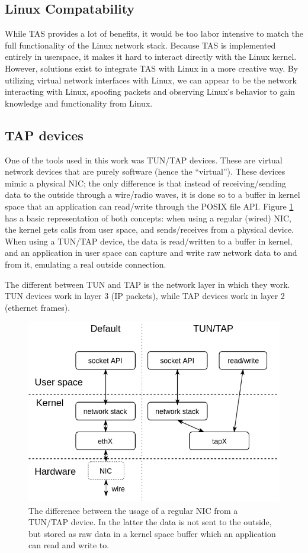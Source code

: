 \subsection{Linux Compatability}

While TAS provides a lot of benefits, it would be too labor intensive to match 
the full functionality of the Linux network stack. Because TAS is implemented
entirely in userspace, it makes it hard to interact directly with the Linux 
kernel. However, solutions exist to integrate TAS with Linux in a more creative
way. By utilizing virtual network interfaces with Linux, we can appear to be the
network interacting with Linux, spoofing packets and observing Linux's behavior 
to gain knowledge and functionality from Linux. 

\subsection{TAP devices}

One of the tools used in this work was TUN/TAP devices. These are virtual network devices that are purely software 
(hence the ``virtual''). These devices mimic a physical NIC; the only difference is that instead of receiving/sending
data to the outside through a wire/radio waves, it is done so to a buffer in kernel space that an application can read/write
through the POSIX file API. Figure \ref{fig:tap} has a basic representation of both concepts: when using a regular (wired)
NIC, the kernel gets calls from user space, and sends/receives from a physical device. When using a TUN/TAP device, the data is
read/written to a buffer in kernel, and an application in user space can capture and write raw network data to and from it, 
emulating a real outside connection.

The different between TUN and TAP is the network layer in which they work. TUN devices work in layer 3 (IP packets), while TAP
devices work in layer 2 (ethernet frames).


\begin{figure}
\centering
\includegraphics[width=0.7\columnwidth]{figures/tap_diag.png}
\caption{The difference between the usage of a regular NIC from a TUN/TAP device. In the latter the data is not sent to the
outside, but stored as raw data in a kernel space buffer which an application can read and write to.}
\label{fig:tap}
\end{figure}
